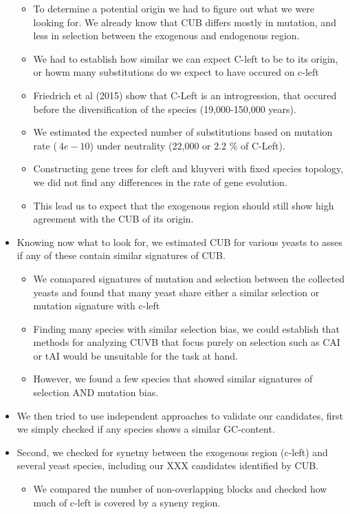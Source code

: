 \documentclass[12pt]{article}
\begin{document}
\begin{itemize}
	\begin{itemize}
		\item To determine a potential origin we had to figure out what we were looking for. We already know that CUB differs mostly in mutation, and less in selection between the exogenous and endogenous region.
		\item We had to establish how similar we can expect C-left to be to its origin, or howm many substitutions do we expect to have occured on c-left
		\item Friedrich et al  (2015) show that C-Left is an introgression, that occured before the diversification of the species (19,000-150,000 years). 
		\item We estimated the expected number of substitutions based on mutation rate ($~4e-10$) under neutrality (22,000 or 2.2 \% of C-Left).
		\item Constructing gene trees for cleft and kluyveri with fixed species topology, we did not find any differences in the rate of gene evolution.
		\item This lead us to expect that the exogenous region should still show high agreement with the CUB of its origin.
	\end{itemize}
	\item Knowing now what to look for, we estimated CUB for various yeasts to asses if any of these contain similar signatures of CUB.
	\begin{itemize}
		\item We comapared signatures of mutation and selection between the collected yeasts and found that many yeast share either a similar selection or mutation signature with c-left	
		\item Finding many species with similar selection bias, we could establish that methods for analyzing CUVB that focus purely on selection such as CAI or tAI would be unsuitable for the task at hand.
		\item However, we found a few species that showed similar signatures of selection AND mutation bias. 
	\end{itemize}
	\item We then tried to use independent approaches to validate our candidates, first we simply checked if any species shows a similar GC-content.
	\item Second, we checked for synetny between the exogenous region (c-left) and several yeast species, including our XXX candidates identified by CUB.
	\begin{itemize}
		\item We compared the number of non-overlapping blocks and checked how much of c-left is covered by a syneny region.

\end{itemize}
\end{itemize}
\end{document}

